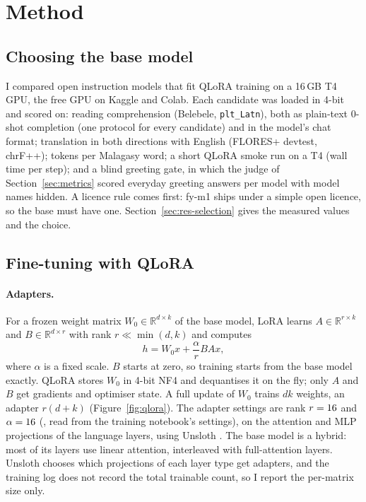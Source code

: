 \documentclass[11pt]{article}
\begin{document}
\section{Method}
\label{sec:method}
\subsection{Choosing the base model}
\label{sec:selection}
I compared open instruction models that fit QLoRA training on a 16\,GB T4 GPU, the free GPU on Kaggle
and Colab. Each candidate was loaded in 4-bit and scored on: reading comprehension (Belebele,
\texttt{plt\_Latn}), both as plain-text 0-shot completion (one protocol for every candidate) and in the
model's chat format; translation in both directions with English (FLORES+ devtest, chrF++); tokens per
Malagasy word; a short QLoRA smoke run on a T4 (wall time per step); and a blind greeting gate, in which
the judge of Section~\ref{sec:metrics} scored \fyGreetAnswers{} everyday greeting answers per model with
model names hidden. A licence rule comes first: fy-m1 ships under a simple open licence, so the base must
have one. Section~\ref{sec:res-selection} gives the measured values and the choice.

\subsection{Fine-tuning with QLoRA}
\label{sec:training}
\paragraph{Adapters.} For a frozen weight matrix $W_0 \in \mathbb{R}^{d \times k}$ of the base model,
LoRA \citep{hu2022lora} learns $A \in \mathbb{R}^{r \times k}$ and $B \in \mathbb{R}^{d \times r}$ with
rank $r \ll \min(d, k)$ and computes
\begin{equation}
  h = W_0 x + \frac{\alpha}{r} B A x ,
  \label{eq:lora}
\end{equation}
where $\alpha$ is a fixed scale. $B$ starts at zero, so training starts from the base model exactly. QLoRA
\citep{dettmers2023qlora} stores $W_0$ in 4-bit NF4 and dequantises it on the fly; only $A$ and $B$ get
gradients and optimiser state. A full update of $W_0$ trains $dk$ weights, an adapter $r(d+k)$
(Figure~\ref{fig:qlora}). The adapter settings are rank $r=16{}$ and $\alpha=16{}$
(, read from the training notebook's settings), on the attention and MLP
projections of the language layers, using Unsloth \citep{unsloth}. The base model is a hybrid: most of
its layers use linear attention, interleaved with full-attention layers. Unsloth chooses which projections
of each layer type get adapters, and the training log does not record the total trainable count, so I
report the per-matrix size only.
\end{document}
